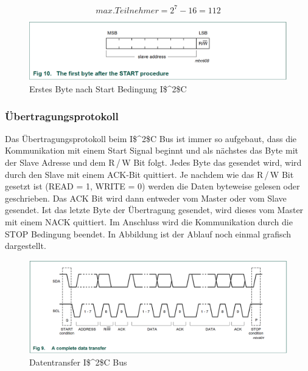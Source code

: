\begin{equation}
max. Teilnehmer = 2^7-16 = 112
\label{Formel_Max_Teilnehmer_I2C}
\end{equation}

\begin{figure}[!h] 
  \centering
     \includegraphics[scale=.65]{BilderAllgemein/I2C_slave_address.png}
  \caption{Erstes Byte nach Start Bedingung \ac{I$^2$C}  \citep[S. 13]{I2C_Datenblatt}}
  \label{Abb_Bild_I2C_Slave_Adresse}
\end{figure}

\subsubsection*{Übertragungsprotokoll}
\label{subsubsection_Übertragungsprotokoll_I2C}
Das Übertragungsprotokoll beim \ac{I$^2$C} Bus ist immer so aufgebaut, dass die Kommunikation mit einem Start Signal beginnt und als nächstes das Byte mit der Slave Adresse und dem R\,/\,W Bit folgt. Jedes Byte das gesendet wird, wird durch den Slave mit einem ACK-Bit quittiert. Je nachdem wie das R\,/\,W Bit gesetzt ist (READ = 1, WRITE = 0) werden die Daten byteweise gelesen oder geschrieben. Das ACK Bit wird dann entweder vom Master oder vom Slave gesendet. Ist das letzte Byte der Übertragung gesendet, wird dieses vom Master mit einem NACK quittiert. Im Anschluss wird die Kommunikation durch die STOP Bedingung beendet. In Abbildung ist der Ablauf noch einmal grafisch dargestellt.\newpage

\begin{figure}[h!] 
  \centering
     \includegraphics[scale=.53]{BilderAllgemein/I2C_data_transfer.png}
  \caption{Datentransfer \ac{I$^2$C} Bus  \citep[S. 13]{I2C_Datenblatt}}
  \label{Abb_Bild_I2C_Slave_Adresse}
\end{figure}
\newpage

